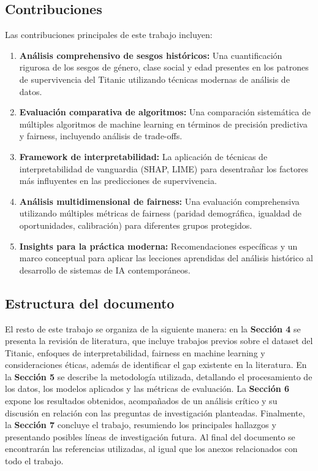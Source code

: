 \documentclass[conference]{IEEEtran}
\begin{document}
\subsection{Contribuciones}

Las contribuciones principales de este trabajo incluyen:

\begin{enumerate}
\item \textbf{Análisis comprehensivo de sesgos históricos:} Una cuantificación rigurosa de los sesgos de género, clase social y edad presentes en los patrones de supervivencia del Titanic utilizando técnicas modernas de análisis de datos.

\item \textbf{Evaluación comparativa de algoritmos:} Una comparación sistemática de múltiples algoritmos de machine learning en términos de precisión predictiva y fairness, incluyendo análisis de trade-offs.

\item \textbf{Framework de interpretabilidad:} La aplicación de técnicas de interpretabilidad de vanguardia (SHAP, LIME) para desentrañar los factores más influyentes en las predicciones de supervivencia.

\item \textbf{Análisis multidimensional de fairness:} Una evaluación comprehensiva utilizando múltiples métricas de fairness (paridad demográfica, igualdad de oportunidades, calibración) para diferentes grupos protegidos.

\item \textbf{Insights para la práctica moderna:} Recomendaciones específicas y un marco conceptual para aplicar las lecciones aprendidas del análisis histórico al desarrollo de sistemas de IA contemporáneos.
\end{enumerate}

\subsection{Estructura del documento}
El resto de este trabajo se organiza de la siguiente manera: en la \textbf{Sección 4} se presenta la revisión de literatura, que incluye trabajos previos sobre el dataset del Titanic, enfoques de interpretabilidad, fairness en machine learning y consideraciones éticas, además de identificar el gap existente en la literatura. En la \textbf{Sección 5} se describe la metodología utilizada, detallando el procesamiento de los datos, los modelos aplicados y las métricas de evaluación. La \textbf{Sección 6} expone los resultados obtenidos, acompañados de un análisis crítico y su discusión en relación con las preguntas de investigación planteadas. Finalmente, la \textbf{Sección 7} concluye el trabajo, resumiendo los principales hallazgos y presentando posibles líneas de investigación futura. Al final del documento se encontrarán las referencias utilizadas, al igual que los anexos relacionados con todo el trabajo.
\end{document}

